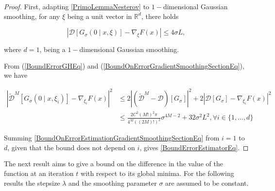 \begin{proof}

First, adapting \ref{PrimoLemmaNesterov} to $1-$dimensional Gaussian smoothing, for any $ \xi $ being a unit vector in $ \mathbb{R}^{d} $, there holds

\begin{equation}\label{BoundOnErrorGradientSmoothingSectionEq}
\left|\mathcal{D}\left[G_{\sigma}(0 \mid x, \xi)\right]-\nabla_{\xi} F(x)\right| \leq 4 \sigma L,
\end{equation}

where $d=1$, being a $1-$dimensional Gaussian smoothing.

From (\ref{BoundErrorGHEq}) and (\ref{BoundOnErrorGradientSmoothingSectionEq}), we have

\begin{equation}\label{BoundOnErrorEstimationGradientSmoothingSectionEq}
 \begin{aligned}\left|\widetilde{\mathcal{D}}^{M}\left[G_{\sigma}\left(0 \mid x, \xi_{i}\right)\right]-\nabla_{\xi_{i}} F(x)\right|^{2} & \leq 2\left|\left(\widetilde{\mathcal{D}}^{M}-\mathcal{D}\right)\left[G_{\sigma}\right]\right|^{2}+2\left|\mathcal{D}\left[G_{\sigma}\right]-\nabla_{\xi_{i}} F(x)\right|^{2} \\ & \leq \frac{2 C^{2}(M !)^{2} \pi}{4^{M}((2 M) !)^{2}} \sigma^{4 M-2}+32 \sigma^{2} L^{2}, \forall i \in\{1, \ldots, d\} \end{aligned} 
\end{equation}

Summing \ref{BoundOnErrorEstimationGradientSmoothingSectionEq} from $ i=1 $ to $ d $, given that the bound does not depend on $i$, gives \ref{BoundErrorEstimatorEq}.

\end{proof}

The next result aims to give a bound on the difference in the value of the function at an iteration $t$ with respect to its global minima. For the following results the stepsize $\lambda$ and the smoothing parameter $\sigma$ are assumed to be constant.

